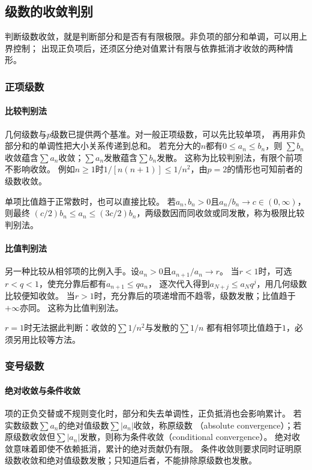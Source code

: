 \subsection{级数的收敛判别}
\label{sec:analysis-series-tests}

判断级数收敛，就是判断部分和是否有有限极限。非负项的部分和单调，可以用上界控制；
出现正负项后，还须区分绝对值累计有限与依靠抵消才收敛的两种情形。

\subsubsection{正项级数}

\paragraph{比较判别法}
几何级数与$p$级数已提供两个基准。对一般正项级数，可以先比较单项，
再用非负部分和的单调性把大小关系传递到总和。
若充分大的$n$都有$0\leq a_n\leq b_n$，则
$\sum b_n$收敛蕴含$\sum a_n$收敛；$\sum a_n$发散蕴含$\sum b_n$发散。
这称为比较判别法，有限个前项不影响收敛。
例如$n\geq1$时$1/[n(n+1)]\leq1/n^2$，由$p=2$的情形也可知前者的级数收敛。

单项比值趋于正常数时，也可以直接比较。
若$a_n,b_n>0$且$a_n/b_n\to c\in(0,\infty)$，则最终
$(c/2)b_n\leq a_n\leq(3c/2)b_n$，两级数因而同收敛或同发散，称为极限比较判别法。

\paragraph{比值判别法}
另一种比较从相邻项的比例入手。设$a_n>0$且$a_{n+1}/a_n\to r$。
当$r<1$时，可选$r<q<1$，使充分靠后都有$a_{n+1}\leq qa_n$，
逐次代入得到$a_{N+j}\leq a_Nq^j$，用几何级数比较便知收敛。
当$r>1$时，充分靠后的项递增而不趋零，级数发散；比值趋于$+\infty$亦同。
这称为比值判别法。

$r=1$时无法据此判断：收敛的$\sum1/n^2$与发散的$\sum1/n$
都有相邻项比值趋于$1$，必须另用比较等方法。

\subsubsection{变号级数}

\paragraph{绝对收敛与条件收敛}
项的正负交替或不规则变化时，部分和失去单调性，正负抵消也会影响累计。
若实数级数$\sum a_n$的绝对值级数$\sum|a_n|$收敛，称原级数
（absolute convergence）；若原级数收敛但$\sum|a_n|$发散，则称为条件收敛（conditional convergence）。
绝对收敛意味着即使不依赖抵消，累计的绝对贡献仍有限。
条件收敛则要求同时证明原级数收敛和绝对值级数发散；只知道后者，不能排除原级数也发散。

